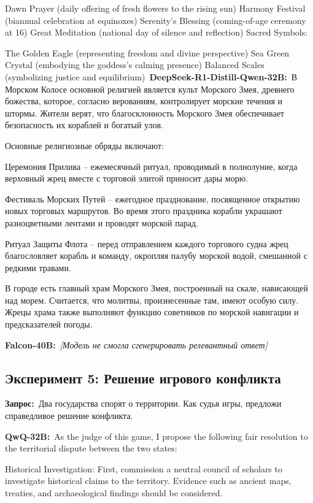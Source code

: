 Dawn Prayer (daily offering of fresh flowers to the rising sun)
Harmony Festival (biannual celebration at equinoxes)
Serenity's Blessing (coming-of-age ceremony at 16)
Great Meditation (national day of silence and reflection)
Sacred Symbols:

The Golden Eagle (representing freedom and divine perspective)
Sea Green Crystal (embodying the goddess's calming presence)
Balanced Scales (symbolizing justice and equilibrium)\
\textbf{DeepSeek-R1-Distill-Qwen-32B:}\
В Морском Колосе основной религией является культ Морского Змея, древнего божества, которое, согласно верованиям, контролирует морские течения и штормы. Жители верят, что благосклонность Морского Змея обеспечивает безопасность их кораблей и богатый улов.

Основные религиозные обряды включают:

Церемония Прилива – ежемесячный ритуал, проводимый в полнолуние, когда верховный жрец вместе с торговой элитой приносит дары морю.

Фестиваль Морских Путей – ежегодное празднование, посвященное открытию новых торговых маршрутов. Во время этого праздника корабли украшают разноцветными лентами и проводят морской парад.

Ритуал Защиты Флота – перед отправлением каждого торгового судна жрец благословляет корабль и команду, окропляя палубу морской водой, смешанной с редкими травами.

В городе есть главный храм Морского Змея, построенный на скале, нависающей над морем. Считается, что молитвы, произнесенные там, имеют особую силу. Жрецы храма также выполняют функцию советников по морской навигации и предсказателей погоды.\

\textbf{Falcon-40B:}\
\textit{[Модель не смогла сгенерировать релевантный ответ]}\

\subsection*{Эксперимент 5: Решение игрового конфликта}

\textbf{Запрос:}\
Два государства спорят о территории. Как судья игры, предложи справедливое решение конфликта.\

\textbf{QwQ-32B:}\
As the judge of this game, I propose the following fair resolution to the territorial dispute between the two states:

Historical Investigation: First, commission a neutral council of scholars to investigate historical claims to the territory. Evidence such as ancient maps, treaties, and archaeological findings should be considered.

